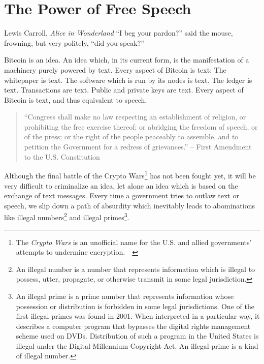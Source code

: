 \chapter{The Power of Free Speech}
\label{les:6}

\begin{chapquote}{Lewis Carroll, \textit{Alice in Wonderland}}
\enquote{I beg your pardon?} said the mouse, frowning, but very politely, \enquote{did you speak?}
\end{chapquote}

Bitcoin is an idea. An idea which, in its current form, is the
manifestation of a machinery purely powered by text. Every aspect of
Bitcoin is text: The whitepaper is text. The software which is run by
its nodes is text. The ledger is text. Transactions are text. Public and
private keys are text. Every aspect of Bitcoin is text, and thus
equivalent to speech.

\begin{samepage}\begin{quotation}
\enquote{Congress shall make no law respecting an establishment of religion,
or prohibiting the free exercise thereof; or abridging the freedom of
speech, or of the press; or the right of the people peaceably to
assemble, and to petition the Government for a redress of grievances.}
\flushright -- First Amendment to the U.S. Constitution
\end{quotation}\end{samepage}

Although the final battle of the Crypto Wars\footnote{The \textit{Crypto Wars}
is an unofficial name for the U.S. and allied governments' attempts to undermine
encryption.~\cite{eff-cryptowars}~\cite{wiki:cryptowars}} has not been fought
yet, it will be very difficult to criminalize an idea, let alone an idea which
is based on the exchange of text messages. Every time a government tries to
outlaw text or speech, we slip down a path of absurdity which inevitably leads
to abominations like illegal numbers\footnote{An illegal number is a number that
represents information which is illegal to possess, utter, propagate, or
otherwise transmit in some legal jurisdiction.\cite{wiki:illegal-number}} and
illegal primes\footnote{An illegal prime is a prime number that represents
information whose possession or distribution is forbidden in some legal
jurisdictions. One of the first illegal primes was found in 2001. When
interpreted in a particular way, it describes a computer program that bypasses
the digital rights management scheme used on DVDs. Distribution of such a
program in the United States is illegal under the Digital Millennium Copyright
Act. An illegal prime is a kind of illegal number.\cite{wiki:illegal-prime}}.

